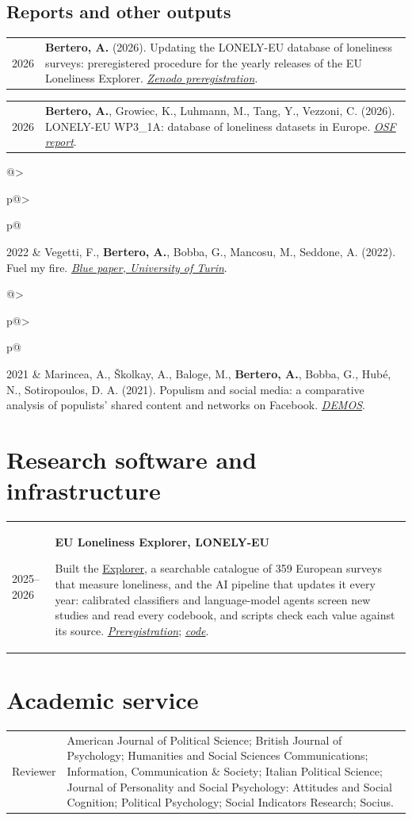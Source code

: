 \documentclass[10pt,a4paper]{article}
\makeatletter
\newlength{\yearw}\setlength{\yearw}{2.3cm}
\newlength{\bodyw}\setlength{\bodyw}{\dimexpr\textwidth-\yearw-0.45cm\relax}
\newcommand{\cv}[2]{%
  \needspace{2\baselineskip}%
  \par\noindent
  \begin{tabular}{@{}>{\raggedright\arraybackslash}p{\yearw}@{\hspace{0.45cm}}>{\raggedright\arraybackslash}p{\bodyw}@{}}
    \sanslabel\fontsize{8.5}{10.5}\selectfont\color{muted}#1 & #2
  \end{tabular}%
  \par\vspace{3pt}%
}
\newcommand{\role}[1]{\textbf{#1}\par}
\newcommand{\venue}[1]{\textit{#1}}
\gdef\urlFuelMyFire{https://scholar.google.com/citations?view_op=view_citation&hl=it&user=C5ps1gwAAAAJ&citation_for_view=C5ps1gwAAAAJ:qjMakFHDy7sC}
\gdef\urlDemosReport{https://scholar.google.com/citations?view_op=view_citation&hl=it&user=C5ps1gwAAAAJ&sortby=pubdate&citation_for_view=C5ps1gwAAAAJ:9yKSN-GCB0IC}
\makeatother
\begin{document}
\subsection{Reports and other outputs}

\cv{2026}{\textbf{Bertero, A.} (2026). Updating the LONELY-EU database of loneliness surveys: preregistered procedure for the yearly releases of the EU Loneliness Explorer. \href{https://doi.org/10.5281/zenodo.23887880}{\venue{Zenodo preregistration}}.}

\cv{2026}{\textbf{Bertero, A.}, Growiec, K., Luhmann, M., Tang, Y., Vezzoni, C. (2026). LONELY-EU WP3\_1A: database of loneliness datasets in Europe. \href{https://doi.org/10.17605/OSF.IO/3T9KG}{\venue{OSF report}}.}

\cv{2022}{Vegetti, F., \textbf{Bertero, A.}, Bobba, G., Mancosu, M., Seddone, A. (2022). Fuel my fire. \href{\urlFuelMyFire}{\venue{Blue paper, University of Turin}}.}

\cv{2021}{Marincea, A., Školkay, A., Baloge, M., \textbf{Bertero, A.}, Bobba, G., Hubé, N., Sotiropoulos, D. A. (2021). Populism and social media: a comparative analysis of populists’ shared content and networks on Facebook. \href{\urlDemosReport}{\venue{DEMOS}}.}

\section{Research software and infrastructure}

\cv{2025–2026}{\role{EU Loneliness Explorer, LONELY-EU}
Built the \href{https://sppqgn-arturo-bertero.shinyapps.io/Lon_Shiny/}{Explorer}, a searchable catalogue of 359 European surveys that measure loneliness, and the AI pipeline that updates it every year: calibrated classifiers and language-model agents screen new studies and read every codebook, and scripts check each value against its source. \href{https://doi.org/10.5281/zenodo.23887880}{\venue{Preregistration}}; \href{https://github.com/arturobertero/LONELY-EU_D3.1}{\venue{code}}.}

\section{Academic service}

\cv{Reviewer}{American Journal of Political Science; British Journal of Psychology; Humanities and Social Sciences Communications; Information, Communication \& Society; Italian Political Science; Journal of Personality and Social Psychology: Attitudes and Social Cognition; Political Psychology; Social Indicators Research; Socius.}
\end{document}
